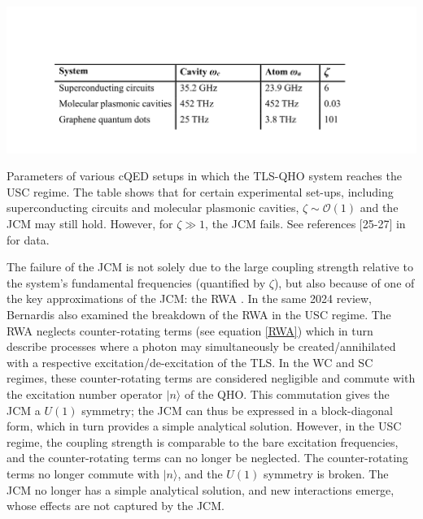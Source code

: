 \documentclass[12pt,a4paper]{article}
\begin{document}
\begin{table}[h]
    \centering
    \includegraphics[scale=1]{coupling_strengths}
    \caption{Parameters of various cQED setups in which the TLS-QHO system reaches the USC regime. The table shows that for certain experimental set-ups, including superconducting circuits and molecular plasmonic cavities,  $\zeta \sim \mathcal{O}(1) $ and the JCM may still hold. However, for $\zeta \gg 1$, the JCM fails. See references [25-27] in \cite{General2024-JCM_relevance} for data.}
    \label{fig:nv_centre}
\end{table}


The failure of the JCM is not solely due to the large coupling strength relative to the system’s fundamental frequencies (quantified by $\zeta$), but also because of one of the key approximations of the JCM: the RWA \cite{General2024-JCM_relevance}. In the same 2024 review, Bernardis also examined the breakdown of the RWA in the USC regime. The RWA neglects counter-rotating terms (see equation \eqref{RWA}) which in turn describe processes where a photon may simultaneously be created/annihilated with a respective excitation/de-excitation of the TLS. In the WC and SC regimes, these counter-rotating terms are considered negligible and commute with the excitation number operator $|n\rangle$ of the QHO. This commutation gives the JCM a $U(1)$ symmetry; the JCM can thus be expressed in a block-diagonal form, which in turn provides a simple analytical solution. However, in the USC regime, the coupling strength is comparable to the bare excitation frequencies, and the counter-rotating terms can no longer be neglected. The counter-rotating terms no longer commute with  $|n\rangle$, and the $U(1)$ symmetry is broken. The JCM no longer has a simple analytical solution, and new interactions emerge, whose effects are not captured by the JCM. 
\end{document}
